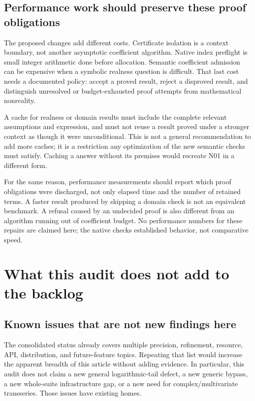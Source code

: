 \documentclass[11pt,a4paper]{article}
\newcommand{\code}[1]{\texttt{\detokenize{#1}}}
\begin{document}
\subsection{Performance work should preserve these proof obligations}
The proposed changes add different costs. Certificate isolation is a context boundary, not another asymptotic coefficient algorithm. Native index preflight is small integer arithmetic done before allocation. Semantic coefficient admission can be expensive when a symbolic realness question is difficult. That last cost needs a documented policy: accept a proved result, reject a disproved result, and distinguish unresolved or budget-exhausted proof attempts from mathematical nonreality.

A cache for realness or domain results must include the complete relevant assumptions and expression, and must not reuse a result proved under a stronger context as though it were unconditional. This is not a general recommendation to add more caches; it is a restriction any optimization of the new semantic checks must satisfy. Caching a \code{True} answer without its premises would recreate N01 in a different form.

For the same reason, performance measurements should report which proof obligations were discharged, not only elapsed time and the number of retained terms. A faster result produced by skipping a domain check is not an equivalent benchmark. A refusal caused by an undecided proof is also different from an algorithm running out of coefficient budget. No performance numbers for these repairs are claimed here; the native checks established behavior, not comparative speed.

\section{What this audit does not add to the backlog}\label{sec:excluded}

\subsection{Known issues that are not new findings here}
The consolidated status already covers multiple precision, refinement, resource, API, distribution, and future-feature topics. Repeating that list would increase the apparent breadth of this article without adding evidence. In particular, this audit does not claim a new general logarithmic-tail defect, a new generic \code{MaxTerms} bypass, a new whole-suite infrastructure gap, or a new need for complex/multivariate transseries. Those issues have existing homes.\cite{repo-status}
\end{document}

